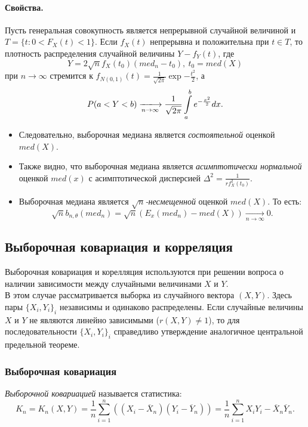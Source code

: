 \paragraph{Свойства.}
Пусть генеральная совокупность является непрерывной случайной величиной
и $T = \{t: 0 < F_X(t) < 1\}$. Если $f_X(t)$ непрерывна и положительна при
$t \in T$, то плотность распределения случайной величины $Y - f_Y(t)$, где
\[
  Y = 2 \sqrt{n} f_X(t_0) (med_n - t_0),~ t_0 = med(X)
\]
при $n \to \infty$ стремится к $f_{N(0, 1)}(t) = \frac{1}{\sqrt{2 \pi}}
\exp{-\frac{t^2}{2}}$, а
\[
  P(a < Y < b) \xlongrightarrow[n \to \infty]{} \frac{1}{\sqrt{2 \pi}}
  \int\limits_{a}^{b} e^{-\frac{x^2}{2}} dx
.\]
\begin{itemize}
  \item Следовательно, выборочная медиана является \textit{состоятельной}
  оценкой $med(X)$.
  \item Также видно, что выборочная медиана является \textit{асимптотически
  нормальной} оценкой $med(x)$ с асимптотической дисперсией
  $\Delta^2 = \frac{1}{r f^2_X(t_0)}$.
  \item Выборочная медиана является \textit{$\sqrt{n}$-несмещенной} оценкой
  $med(X)$. То есть:
  \[
    \sqrt{n} b_{n, \theta} (med_n) = \sqrt{n} (E_x(med_n) - med(X))
    \xrightarrow[n \to \infty]{} 0
  .\]
\end{itemize}



\subsection{Выборочная ковариация и корреляция}

Выборочная ковариация и корелляция используются при решении вопроса о наличии
зависимости между случайными величинами $X$ и $Y$.\\

В этом случае рассматривается выборка из случайного вектора $(X, Y)$. Здесь
пары $\{X_i, Y_i\}_i$ независимы и одинаково распределены. Если случайные
величины $X$ и $Y$ не являются линейно зависимыми ($r(X, Y) \neq 1$), то для
последовательности $\{X_i, Y_i\}_i$ справедливо утверждение аналогичное
центральной предельной теореме.

\subsubsection{Выборочная ковариация}

\begin{definition}
  \textit{Выборочной ковариацией} называется статистика:
  \[
    K_n = K_n(X, Y) = \frac{1}{n} \sum\limits_{i = 1}^{n}
    ((X_i - \overline{X}_n) (Y_i - \overline{Y}_n)) =
    \frac{1}{n} \sum\limits_{i = 1}^{n} X_i Y_i - \overline{X}_n \overline{Y}_n
  .\]
\end{definition}


